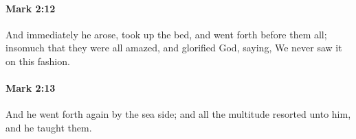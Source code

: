 		\paragraph{Mark 2:12} %
			\label{MARK-2-12}

			And immediately he arose, took up the bed, and went forth before them all; insomuch that they were all amazed, and glorified God, saying, We never saw it on this fashion.

			\begin{framed}
			\scriptsize
				\begin{compactdesc}
					\item[SBLG] 
				\end{compactdesc}
			\end{framed}

		\paragraph{Mark 2:13} %
			\label{MARK-2-13}

			And he went forth again by the sea side; and all the multitude resorted unto him, and he taught them.

